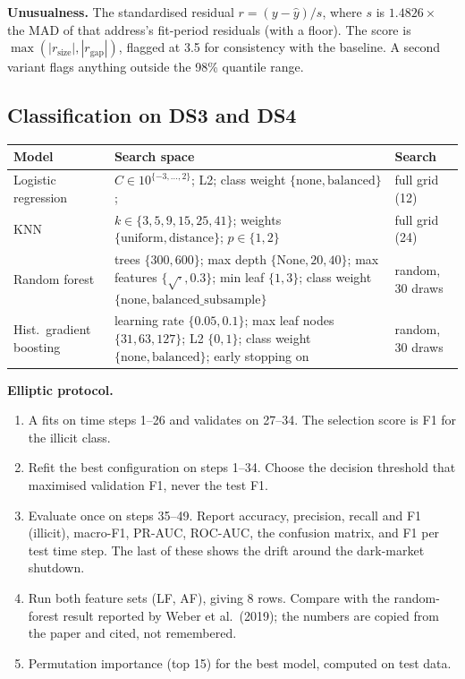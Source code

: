 \textbf{Unusualness.} The standardised residual $r = (y-\hat y)/s$, where $s$ is $1.4826 \times$
the MAD of that address's fit-period residuals (with a floor). The score is $\max(|r_{\text{size}}|,
|r_{\text{gap}}|)$, flagged at 3.5 for consistency with the baseline. A second variant flags
anything outside the 98\% quantile range.

\subsection{Classification on DS3 and DS4}
\label{sec:classification}

\begin{longtable}{@{}L{3.0cm}L{8.2cm}L{3.2cm}@{}}
\toprule
\textbf{Model} & \textbf{Search space} & \textbf{Search} \\
\midrule
\endhead
Logistic regression & $C \in 10^{\{-3,\dots,2\}}$; L2; class weight $\{\text{none}, \text{balanced}\}$;  & full grid (12) \\
KNN & $k \in \{3,5,9,15,25,41\}$; weights $\{\text{uniform}, \text{distance}\}$; $p \in \{1,2\}$ & full grid (24) \\
Random forest & trees $\{300,600\}$; max depth $\{\text{None},20,40\}$; max features $\{\sqrt{\cdot}, 0.3\}$; min leaf $\{1,3\}$; class weight $\{\text{none}, \text{balanced\_subsample}\}$ & random, 30 draws \\
Hist.\ gradient boosting & learning rate $\{0.05, 0.1\}$; max leaf nodes $\{31,63,127\}$; L2 $\{0,1\}$; class weight $\{\text{none}, \text{balanced}\}$; early stopping on & random, 30 draws \\
\bottomrule
\end{longtable}

\textbf{Elliptic protocol.}
\begin{enumerate}
  \item A  fits on time steps 1--26 and validates on 27--34. The selection
    score is F1 for the illicit class.
  \item Refit the best configuration on steps 1--34. Choose the decision threshold that maximised
    validation F1, never the test F1.
  \item Evaluate once on steps 35--49. Report accuracy, precision, recall and F1 (illicit),
    macro-F1, PR-AUC, ROC-AUC, the confusion matrix, and F1 per test time step. The last of these
    shows the drift around the dark-market shutdown.
  \item Run both feature sets (LF, AF), giving 8 rows. Compare with the random-forest result
    reported by Weber et al.\ (2019); the numbers are copied from the paper and cited, not
    remembered.
  \item Permutation importance (top 15) for the best model, computed on test data.
\end{enumerate}

